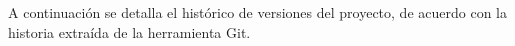 A continuación se detalla el histórico de versiones del proyecto, de acuerdo con la historia extraída de la herramienta Git.
\begin{flushleft}
    \begin{itemize}
        
    \end{itemize}
\end{flushleft}